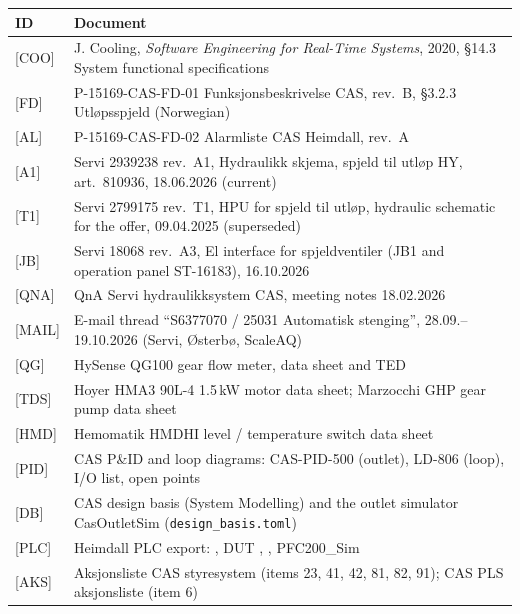 \documentclass[11pt,a4paper]{article}
\begin{document}
\begin{small}
\begin{tabularx}{\textwidth}{@{}lL@{}}
\toprule
ID & Document \\
\midrule
{[COO]}  & J. Cooling, \emph{Software Engineering for Real-Time Systems}, 2020, §14.3 System functional specifications \\
{[FD]}   & P-15169-CAS-FD-01 Funksjonsbeskrivelse CAS, rev.~B, §3.2.3 Utløpsspjeld (Norwegian) \\
{[AL]}   & P-15169-CAS-FD-02 Alarmliste CAS Heimdall, rev.~A \\
{[A1]}   & Servi 2939238 rev.~A1, Hydraulikk skjema, spjeld til utløp HY, art.~810936, 18.06.2026 (current) \\
{[T1]}   & Servi 2799175 rev.~T1, HPU for spjeld til utløp, hydraulic schematic for the offer, 09.04.2025 (superseded) \\
{[JB]}   & Servi 18068 rev.~A3, El interface for spjeldventiler (JB1 and operation panel ST-16183), 16.10.2026 \\
{[QNA]}  & QnA Servi hydraulikksystem CAS, meeting notes 18.02.2026 \\
{[MAIL]} & E-mail thread ``S6377070 / 25031 Automatisk stenging'', 28.09.--19.10.2026 (Servi, Østerbø, ScaleAQ) \\
{[QG]}   & HySense QG100 gear flow meter, data sheet and TED \\
{[TDS]}  & Hoyer HMA3 90L-4 1.5\,kW motor data sheet; Marzocchi GHP gear pump data sheet \\
{[HMD]}  & Hemomatik HMDHI level / temperature switch data sheet \\
{[PID]}  & CAS P\&ID and loop diagrams: CAS-PID-500 (outlet), LD-806 (loop), I/O list, open points \\
{[DB]}   & CAS design basis (System Modelling) and the outlet simulator CasOutletSim (\texttt{design\_basis.toml}) \\
{[PLC]}  & Heimdall PLC export: , DUT , , PFC200\_Sim  \\
{[AKS]}  & Aksjonsliste CAS styresystem (items 23, 41, 42, 81, 82, 91); CAS PLS aksjonsliste (item 6) \\
\bottomrule
\end{tabularx}
\end{small}
\end{document}
